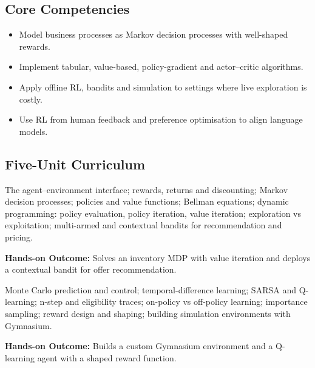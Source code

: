 \documentclass[10pt,a4paper]{article}
\begin{document}
\subsection*{Core Competencies}\begin{itemize}\small
\item Model business processes as Markov decision processes with well-shaped rewards.
\item Implement tabular, value-based, policy-gradient and actor–critic algorithms.
\item Apply offline RL, bandits and simulation to settings where live exploration is costly.
\item Use RL from human feedback and preference optimisation to align language models.
\end{itemize}
\subsection*{Five-Unit Curriculum}
\begin{tcolorbox}[unitbox,title={{\color{gold}UNIT I}\quad RL Foundations and MDPs\hfill{\color{gold}9 Hours}}]\small The agent–environment interface; rewards, returns and discounting; Markov decision processes; policies and value functions; Bellman equations; dynamic programming: policy evaluation, policy iteration, value iteration; exploration vs exploitation; multi-armed and contextual bandits for recommendation and pricing.\par\vspace{2pt}\par\textbf{Hands-on Outcome:} Solves an inventory MDP with value iteration and deploys a contextual bandit for offer recommendation.\end{tcolorbox}
\begin{tcolorbox}[unitbox,title={{\color{gold}UNIT II}\quad Model-Free Tabular Methods\hfill{\color{gold}9 Hours}}]\small Monte Carlo prediction and control; temporal-difference learning; SARSA and Q-learning; n-step and eligibility traces; on-policy vs off-policy learning; importance sampling; reward design and shaping; building simulation environments with Gymnasium.\par\vspace{2pt}\par\textbf{Hands-on Outcome:} Builds a custom Gymnasium environment and a Q-learning agent with a shaped reward function.\end{tcolorbox}
\end{document}
